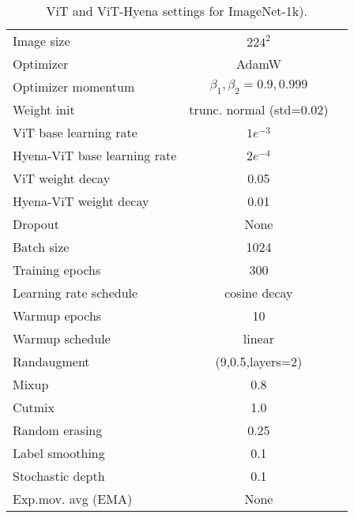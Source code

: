 \begin{table}[ht]
      \small
      \caption{ViT and ViT-Hyena settings for ImageNet-1k).
      }
        \centering
        \begin{tabular}{lcc}
            \toprule
            Image size & $224^2$ \\
            Optimizer & AdamW \\
            Optimizer momentum & $\beta_1,\beta_2=0.9,0.999$ \\
            Weight init & trunc. normal (std=0.02) \\
            ViT base learning rate & $1e^{-3}$ \\
            Hyena-ViT base learning rate & $2e^{-4}$ \\
            ViT weight decay & 0.05 \\
            Hyena-ViT weight decay & 0.01 \\
            Dropout & None \\
            Batch size & 1024 \\
            Training epochs & 300 \\
            Learning rate schedule & cosine decay \\
            Warmup epochs & 10 \\
            Warmup schedule & linear \\
            Randaugment \citep{cubuk2020randaugment} & (9,0.5,layers=2)  \\
            Mixup \citep{zhang2017mixup} & 0.8 \\
            Cutmix \citep{yun2019cutmix} & 1.0 \\
            Random erasing \citep{zhong2020random} & 0.25 \\
            Label smoothing \citep{szegedy2016rethinking} & 0.1 \\
            Stochastic depth \citep{huang2016deep} & 0.1 \\
            Exp.mov. avg (EMA) \citep{polyak1992ema} & None \\
            \bottomrule
        \end{tabular}
        \label{tab:imagenet_hparams}
\end{table}
%



